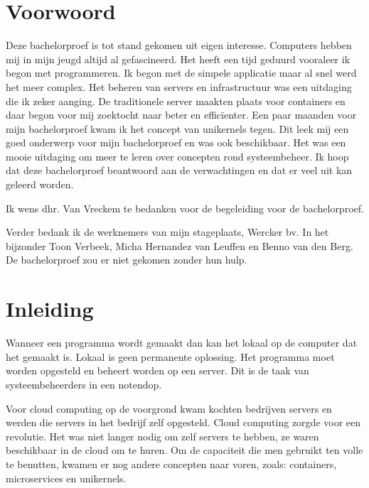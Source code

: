\documentclass[pdftex,a4paper,12pt,twoside]{report}
\begin{document}
\begin{abstract}
\end{abstract}

\chapter*{Voorwoord}
\label{ch:voorwoord}

Deze bachelorproef is tot stand gekomen uit eigen interesse. Computers hebben mij in mijn jeugd altijd al gefascineerd. Het heeft een tijd geduurd vooraleer ik begon met programmeren. Ik begon met de simpele applicatie maar al snel werd het meer complex.  Het beheren van servers en infrastructuur was een uitdaging die ik zeker aanging. De traditionele server maakten plaats voor containers en daar begon voor mij zoektocht naar beter en efficïenter. Een paar maanden voor mijn bachelorproef kwam ik het concept van unikernels tegen. Dit leek mij een goed onderwerp voor mijn bachelorproef en was ook beschikbaar. Het was een mooie uitdaging om meer te leren over concepten rond systeembeheer. Ik hoop dat deze bachelorproef beantwoord aan de verwachtingen en dat er veel uit kan geleerd worden.

Ik wens dhr. Van Vreckem te bedanken voor de begeleiding voor de bachelorproef.

Verder bedank ik de werknemers van mijn stageplaats, Wercker bv. In het bijzonder Toon Verbeek, Micha Hernandez van Leuffen en Benno van den Berg. De bachelorproef zou er niet gekomen zonder hun hulp.

\tableofcontents

\chapter{Inleiding}
\label{ch:inleiding}

Wanneer een programma wordt gemaakt dan kan het lokaal op de computer dat het gemaakt is. Lokaal is geen permanente oplossing. Het programma moet worden opgesteld en beheert worden op een server. Dit is de taak van systeembeheerders in een notendop.

Voor cloud computing op de voorgrond kwam kochten bedrijven servers en werden die servers in het bedrijf zelf opgesteld. Cloud computing zorgde voor een revolutie. Het was niet langer nodig om zelf servers te hebben, ze waren beschikbaar in de cloud om te huren. Om de capaciteit die men gebruikt ten volle te benutten, kwamen er nog andere concepten naar voren, zoals: containers, microservices en unikernels.
\end{document}
